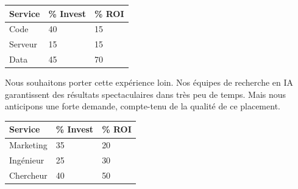 \documentclass[landscape,a0paper,fontscale=0.285]{baposter} %
\begin{document}
\begin{poster}
{\begin{center}
\begin{tabular}{l l l}
\toprule
\textbf{Service} & \textbf{\% Invest} & \textbf{\% ROI}\\
\midrule
Code & 40 & 15 \\
Serveur & 15 & 15 \\
Data & 45 & 70 \\
\bottomrule
\end{tabular}
\end{center}

Nous souhaitons porter cette expérience loin. Nos équipes de recherche en IA garantissent des résultats spectaculaires dans très peu de temps. Mais nous anticipons une forte demande, compte-tenu de la qualité de ce placement.

\begin{center}
\begin{tabular}{l l l}
\toprule
\textbf{Service} & \textbf{\% Invest} & \textbf{\% ROI}\\
\midrule
Marketing & 35 & 20 \\
Ingénieur & 25 & 30 \\
Chercheur & 40 & 50 \\
\bottomrule
\end{tabular}
\end{center}
}


\end{poster}
\end{document}

